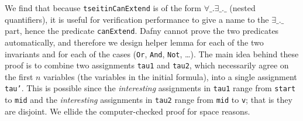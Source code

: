 We find that because \texttt{tseitinCanExtend} is of the form
\( \forall \_ . \exists \_ . \_ \) (nested quantifiers), it is useful
for verification performance to give a name to the
\( \exists \_ . \_ \) part, hence the predicate \texttt{canExtend}.
Dafny cannot prove the two predicates automatically, and therefore we
design helper lemma for each of the two invariants and for each of the
cases (\texttt{Or}, \texttt{And}, \texttt{Not}, \ldots).%
%
%
%
%
%
The main idea behind these proof is to combine two assignments
\texttt{tau1} and \texttt{tau2}, which necessarily agree on the first
\( n \) variables (the variables in the initial formula), into a
single assignment \texttt{tau'}. This is possible since the
\emph{interesting} assignments in \texttt{tau1} range from
\texttt{start} to \texttt{mid} and the \emph{interesting} assignments
in \texttt{tau2} range from \texttt{mid} to \texttt{v}; that is they
are disjoint. We ellide the computer-checked proof for space reasons.

